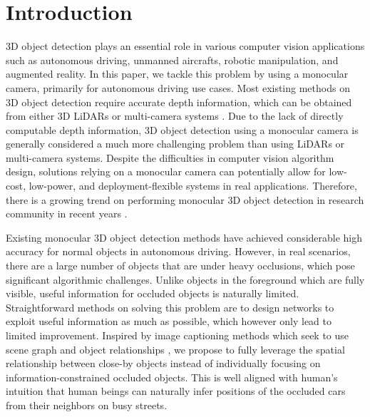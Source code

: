\documentclass[10pt,twocolumn,letterpaper]{article}
\begin{document}
\section{Introduction}
\label{sec:intro}
3D object detection plays an essential role in  various computer vision applications such as autonomous driving, unmanned aircrafts, robotic manipulation, and augmented reality.
In this paper,
we tackle this problem by using a monocular camera, primarily for autonomous driving use cases.
Most existing methods on 3D object detection require accurate depth information, which can be obtained from either 3D
LiDARs \cite{chen_multiview_2016, qi_frustum_2017, shi_pointrcnn_2018, shin_roarnet_2018, liang_deep_2018, zhou_voxelnet_2017} or
multi-camera systems \cite{chen_3d_2015, chen_3d_2018, li_stereo_2019, pham_robust_2017, qin_triangulation_2019, xu_multilevel_2018}.
Due to the lack of directly computable depth information,
3D object detection using a monocular camera is generally considered a much more challenging problem than using LiDARs or multi-camera systems.
Despite the difficulties in computer vision algorithm design,
solutions relying on a monocular camera can potentially allow for low-cost, low-power, and deployment-flexible systems in real applications. Therefore, there is a growing trend on performing monocular 3D object detection in research community in recent years \cite{brazil_m3d_rpn_2019, chen_monocular_2016, manhardt_roi_10d_2018, mousavian_3d_2017, qin_monogrnet_2018, simonelli_disentangling_2019}.



Existing monocular 3D object detection methods have achieved considerable high accuracy for normal objects in autonomous driving. However, in real scenarios, there are a large number of objects that are under heavy occlusions, which pose significant algorithmic challenges.
Unlike objects in the foreground which are fully visible, useful information for occluded objects is naturally limited.
Straightforward methods on solving this problem are to design networks to exploit useful information as much as possible, which however only lead to limited improvement.
Inspired by image captioning methods which seek to use scene graph and object relationships \cite{dai2017detecting, Li_2017_ICCV, Yao_2018_ECCV} , we propose to fully leverage the spatial relationship between close-by objects instead of
individually focusing on information-constrained occluded objects.
This is well aligned with human's intuition that
human beings can naturally infer positions of the occluded cars from their neighbors on busy streets.
\end{document}
